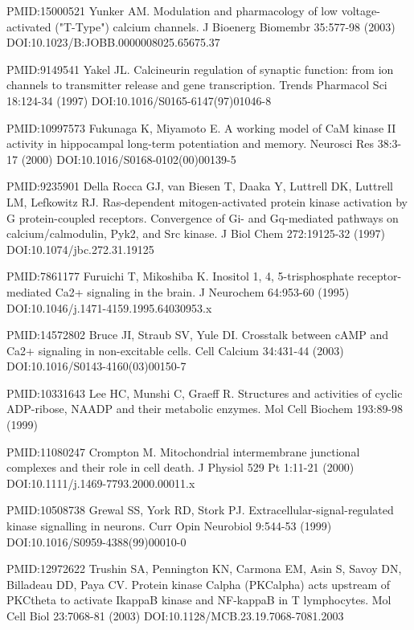 \begin{thebibliography}{00}
PMID:15000521
 Yunker AM.
\newblock Modulation and pharmacology of low voltage-activated ("T-Type") calcium channels.
\newblock J Bioenerg Biomembr 35:577-98 (2003) DOI:10.1023/B:JOBB.0000008025.65675.37

PMID:9149541
 Yakel JL.
\newblock Calcineurin regulation of synaptic function: from ion channels to transmitter release and gene transcription.
\newblock Trends Pharmacol Sci 18:124-34 (1997) DOI:10.1016/S0165-6147(97)01046-8

PMID:10997573
 Fukunaga K, Miyamoto E.
\newblock A working model of CaM kinase II activity in hippocampal long-term potentiation and memory.
\newblock Neurosci Res 38:3-17 (2000) DOI:10.1016/S0168-0102(00)00139-5

PMID:9235901
 Della Rocca GJ, van Biesen T, Daaka Y, Luttrell DK, Luttrell LM, Lefkowitz RJ.
\newblock Ras-dependent mitogen-activated protein kinase activation by G protein-coupled receptors. Convergence of Gi- and Gq-mediated pathways on calcium/calmodulin, Pyk2, and Src kinase.
\newblock J Biol Chem 272:19125-32 (1997) DOI:10.1074/jbc.272.31.19125

PMID:7861177
 Furuichi T, Mikoshiba K.
\newblock Inositol 1, 4, 5-trisphosphate receptor-mediated Ca2+ signaling in the brain.
\newblock J Neurochem 64:953-60 (1995) DOI:10.1046/j.1471-4159.1995.64030953.x

PMID:14572802
 Bruce JI, Straub SV, Yule DI.
\newblock Crosstalk between cAMP and Ca2+ signaling in non-excitable cells.
\newblock Cell Calcium 34:431-44 (2003) DOI:10.1016/S0143-4160(03)00150-7

PMID:10331643
 Lee HC, Munshi C, Graeff R.
\newblock Structures and activities of cyclic ADP-ribose, NAADP and their metabolic enzymes.
\newblock Mol Cell Biochem 193:89-98 (1999)

PMID:11080247
 Crompton M.
\newblock Mitochondrial intermembrane junctional complexes and their role in cell death.
\newblock J Physiol 529 Pt 1:11-21 (2000) DOI:10.1111/j.1469-7793.2000.00011.x

PMID:10508738
 Grewal SS, York RD, Stork PJ.
\newblock Extracellular-signal-regulated kinase signalling in neurons.
\newblock Curr Opin Neurobiol 9:544-53 (1999) DOI:10.1016/S0959-4388(99)00010-0

PMID:12972622
 Trushin SA, Pennington KN, Carmona EM, Asin S, Savoy DN, Billadeau DD, Paya CV.
\newblock Protein kinase Calpha (PKCalpha) acts upstream of PKCtheta to activate IkappaB kinase and NF-kappaB in T lymphocytes.
\newblock Mol Cell Biol 23:7068-81 (2003) DOI:10.1128/MCB.23.19.7068-7081.2003


\end{thebibliography}
